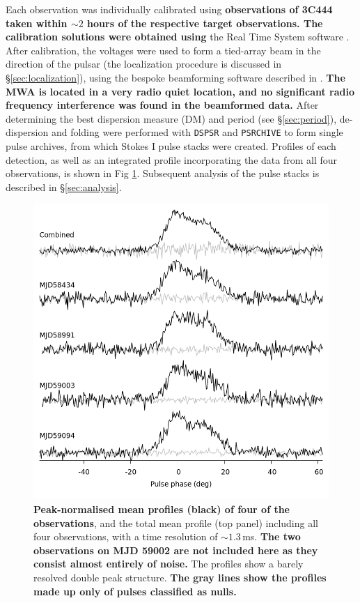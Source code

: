 \documentclass[linenumbers]{aastex631}
\begin{document}
Each observation was individually calibrated using {\bf observations of 3C444 taken within $\sim 2$ hours of the respective target observations.
The calibration solutions were obtained using} the Real Time System software \citep{Mitchell2008}.
After calibration, the voltages were used to form a tied-array beam in the direction of the pulsar (the localization procedure is discussed in \S\ref{sec:localization}), using the bespoke beamforming software described in \citet{Ord2019}.
{\bf The MWA is located in a very radio quiet location, and no significant radio frequency interference was found in the beamformed data.}
After determining the best dispersion measure (DM) and period (see \S\ref{sec:period}), de-dispersion and folding were performed with {\tt DSPSR} \citep{VanStraten2011b} and {\tt PSRCHIVE} \citep{Hotan2004} to form single pulse archives, from which Stokes I pulse stacks were created.
Profiles of each detection, as well as an integrated profile incorporating the data from all four observations, is shown in Fig \ref{fig:profiles}.
Subsequent analysis of the pulse stacks is described in \S\ref{sec:analysis}.
\begin{figure}[!th]
    \centering
    \includegraphics[width=\linewidth]{profiles.png}
    \caption{{\bf Peak-normalised mean profiles (black) of four of the observations}, and the total mean profile (top panel) including all four observations, with a time resolution of $\sim 1.3\,$ms. {\bf The two observations on MJD 59002 are not included here as they consist almost entirely of noise.} The profiles show a barely resolved double peak structure. {\bf The gray lines show the profiles made up only of pulses classified as nulls.}}
    \label{fig:profiles}
\end{figure}
\end{document}
